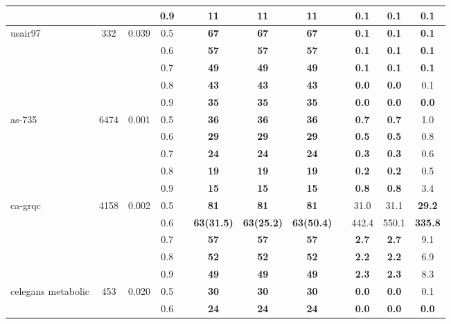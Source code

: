 \begin{table}[ht]
{\begin{tabular}{l c c c c c c c c c c c}
& & & 0.9 & & \textbf{11} & \textbf{11} & \textbf{11} & & \textbf{0.1} & \textbf{0.1} & \textbf{0.1} \\
\midrule
usair97 & 332 & 0.039 & 0.5 & & \textbf{67} & \textbf{67} & \textbf{67} & & \textbf{0.1} & \textbf{0.1} & \textbf{0.1} \\
& & & 0.6 & & \textbf{57} & \textbf{57} & \textbf{57} & & \textbf{0.1} & \textbf{0.1} & \textbf{0.1} \\
& & & 0.7 & & \textbf{49} & \textbf{49} & \textbf{49} & & \textbf{0.1} & \textbf{0.1} & \textbf{0.1} \\
& & & 0.8 & & \textbf{43} & \textbf{43} & \textbf{43} & & \textbf{0.0} & \textbf{0.0} & 0.1 \\
& & & 0.9 & & \textbf{35} & \textbf{35} & \textbf{35} & & \textbf{0.0} & \textbf{0.0} & \textbf{0.0} \\
\midrule
as-735 & 6474 & 0.001 & 0.5 & & \textbf{36} & \textbf{36} & \textbf{36} & & \textbf{0.7} & \textbf{0.7} & 1.0 \\
& & & 0.6 & & \textbf{29} & \textbf{29} & \textbf{29} & & \textbf{0.5} & \textbf{0.5} & 0.8 \\
& & & 0.7 & & \textbf{24} & \textbf{24} & \textbf{24} & & \textbf{0.3} & \textbf{0.3} & 0.6 \\
& & & 0.8 & & \textbf{19} & \textbf{19} & \textbf{19} & & \textbf{0.2} & \textbf{0.2} & 0.5 \\
& & & 0.9 & & \textbf{15} & \textbf{15} & \textbf{15} & & \textbf{0.8} & \textbf{0.8} & 3.4 \\
\midrule
ca-grqc & 4158 & 0.002 & 0.5 & & \textbf{81} & \textbf{81} & \textbf{81} & & 31.0 & 31.1 & \textbf{29.2} \\
& & & 0.6 & & \textbf{63(31.5)} & \textbf{63(25.2)} & \textbf{63(50.4)} & & 442.4 & 550.1 & \textbf{335.8} \\
& & & 0.7 & & \textbf{57} & \textbf{57} & \textbf{57} & & \textbf{2.7} & \textbf{2.7} & 9.1 \\
& & & 0.8 & & \textbf{52} & \textbf{52} & \textbf{52} & & \textbf{2.2} & \textbf{2.2} & 6.9 \\
& & & 0.9 & & \textbf{49} & \textbf{49} & \textbf{49} & & \textbf{2.3} & \textbf{2.3} & 8.3 \\
\midrule
celegans metabolic & 453 & 0.020 & 0.5 & & \textbf{30} & \textbf{30} & \textbf{30} & & \textbf{0.0} & \textbf{0.0} & 0.1 \\
& & & 0.6 & & \textbf{24} & \textbf{24} & \textbf{24} & & \textbf{0.0} & \textbf{0.0} & \textbf{0.0} \\

\end{tabular}}
\end{table}
